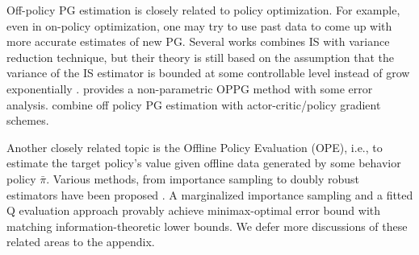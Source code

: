 \documentclass{article}
\numberwithin{equation}{section}
\begin{document}
Off-policy PG estimation is closely related to policy optimization. For example, even in on-policy optimization, one may try to use past data to come up with more accurate estimates of new PG. %
Several works \cite{papini2018stochastic, xu2020improved, xu2019sample} combines IS with variance reduction technique, but their theory is still based on the assumption that the variance of the IS estimator is bounded at some controllable level instead of grow exponentially \cite{jiang2016doubly, degris2012off, kallus2020statistically}. %
\cite{tosatto2020nonparametric} provides a non-parametric OPPG method with some error analysis. \cite{liu2019off, gu2016q} combine off policy PG estimation with actor-critic/policy gradient schemes.

Another closely related topic is the Offline Policy Evaluation (OPE), i.e., to estimate the target policy's value given offline data generated by some behavior policy $\bar{\pi}$. Various methods, from importance sampling to doubly robust estimators have been proposed \cite{tokdar2010importance,10.5555/645529.658134, jiang2016doubly, thomas2016data}. A marginalized importance sampling \cite{xie2019towards} and a fitted Q evaluation approach provably achieve minimax-optimal error bound with matching information-theoretic lower bounds.  %
We defer more discussions of these related areas to the appendix.
\end{document}
